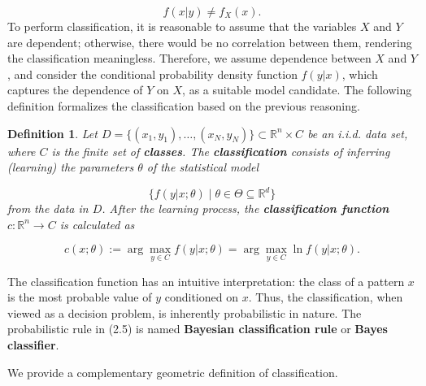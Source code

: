 \documentclass{report}
\newtheorem{definition}{Definition}[chapter]
\begin{document}
\begin{equation}
f(x|y) \neq f_X(x).
\end{equation}
To perform classification, it is reasonable to assume that the variables $X$ and $Y$ are dependent; otherwise, there would be no correlation between them, rendering the classification meaningless. Therefore, we assume dependence between $X$ and $Y$, and consider the conditional probability density function $f(y|x)$, which captures the dependence of $Y$ on $X$, as a suitable model candidate. The following definition formalizes the classification based on the previous reasoning.

\begin{definition}
Let $D = \{(x_1,y_1),\dots,(x_N,y_N)\} \subset \mathbb{R}^n \times C$ be an i.i.d. data set, where $C$ is the finite set of \textbf{classes}. The \textbf{classification} consists of inferring (learning) the parameters $\theta$ of the statistical model

\begin{equation}
\{f(y|x;\theta) \mid \theta \in \Theta \subseteq \mathbb{R}^d\}
\end{equation}
from the data in $D$. After the learning process, the \textbf{classification function} $c : \mathbb{R}^n \to C$ is calculated as

\begin{equation}
c(x;\theta) := \arg \max_{y \in C} f(y|x;\theta) = \arg \max_{y \in C} \ln f(y|x;\theta).
\end{equation}
\end{definition}
The classification function has an intuitive interpretation: the class of a pattern $x$ is the most probable value of $y$ conditioned on $x$. Thus, the classification, when viewed as a decision problem, is inherently probabilistic in nature. The probabilistic rule in (2.5) is named \textbf{Bayesian classification rule} or \textbf{Bayes classifier}.

We provide a complementary geometric definition of classification.
\end{document}

